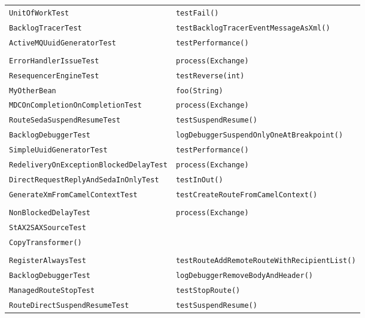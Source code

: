 \begin{center}
\begin{longtable}{ll}
\lstinline/UnitOfWorkTest/&{\lstinline/testFail()/}\\
\lstinline/BacklogTracerTest/&{\lstinline/testBacklogTracerEventMessageAsXml()/}\\
\lstinline/ActiveMQUuidGeneratorTest/&{\lstinline/testPerformance()/}\\
\raisebox{-13pt}{\shortstack{\lstinline/SameRouteAndContextScoped/-\\\lstinline/ErrorHandlerIssueTest/}}&{\lstinline/process(Exchange)/}\\
\lstinline/ResequencerEngineTest/&{\lstinline/testReverse(int)/}\\
\lstinline/MyOtherBean/&{\lstinline/foo(String)/}\\
\lstinline/MDCOnCompletionOnCompletionTest/&{\lstinline/process(Exchange)/}\\
\lstinline/RouteSedaSuspendResumeTest/&{\lstinline/testSuspendResume()/}\\
\lstinline/BacklogDebuggerTest/&{\lstinline/logDebuggerSuspendOnlyOneAtBreakpoint()/}\\
\lstinline/SimpleUuidGeneratorTest/&{\lstinline/testPerformance()/}\\
\lstinline/RedeliveryOnExceptionBlockedDelayTest/&{\lstinline/process(Exchange)/}\\
\lstinline/DirectRequestReplyAndSedaInOnlyTest/&{\lstinline/testInOut()/}\\
\lstinline/GenerateXmFromCamelContextTest/&{\lstinline/testCreateRouteFromCamelContext()/}\\
\raisebox{-13pt}{\shortstack{\lstinline/AsyncEndpointRedeliveryErrorHandler/-\\\lstinline/NonBlockedDelayTest/}}&{\lstinline/process(Exchange)/}\\
\lstinline/StAX2SAXSourceTest/&\raisebox{-13pt}{\shortstack{\lstinline/testDefaultPrefixInRootElementWith/-\\\lstinline/CopyTransformer()/}}\\
\raisebox{-13pt}{\shortstack{\lstinline/ManagedProducerRouteAddRemove/-\\\lstinline/RegisterAlwaysTest/}}&{\lstinline/testRouteAddRemoteRouteWithRecipientList()/}\\
\lstinline/BacklogDebuggerTest/&{\lstinline/logDebuggerRemoveBodyAndHeader()/}\\
\lstinline/ManagedRouteStopTest/&{\lstinline/testStopRoute()/}\\
\lstinline/RouteDirectSuspendResumeTest/&{\lstinline/testSuspendResume()/}\\

\end{longtable}
\end{center}
